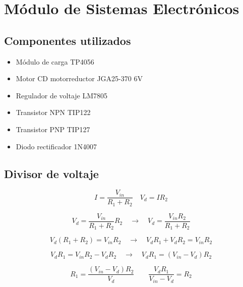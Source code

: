 \section{Módulo de Sistemas Electrónicos}

\subsection{Componentes utilizados}

{\justify
    \renewcommand{\labelitemi}{$\bullet$}
    \begin{itemize}
        \item Módulo de carga TP4056
        \item Motor CD motorreductor JGA25-370 6V
        \item Regulador de voltaje LM7805
        \item Transistor NPN TIP122
        \item Transistor PNP TIP127
        \item Diodo rectificador 1N4007
    \end{itemize}
}

\subsection{Divisor de voltaje}

{\justify
    \begin{equation*}
        I = \dfrac{V_{in}}{R_1 + R_2} \quad V_d = I R_2
    \end{equation*}

    \begin{equation*}
        V_d = \dfrac{V_{in}}{R_1 + R_2} R_2 \quad\rightarrow\quad V_d = \dfrac{V_{in} R_2}{R_1 + R_2}
    \end{equation*}

    \begin{equation*}
        V_d (R_1 + R_2) = V_{in} R_2 \quad\rightarrow\quad V_d R_1 + V_d R_2 = V_{in} R_2
    \end{equation*}

    \begin{equation*}
        V_d R_1 = V_{in} R_2 - V_d R_2 \quad\rightarrow\quad V_d R_1 = (V_{in} - V_d) R_2
    \end{equation*}

    \begin{equation*}
        R_1 = \dfrac{(V_{in} - V_d) R_2}{V_d} \quad\quad \dfrac{V_d R_1}{V_{in} - V_d} = R_2
    \end{equation*}
}
